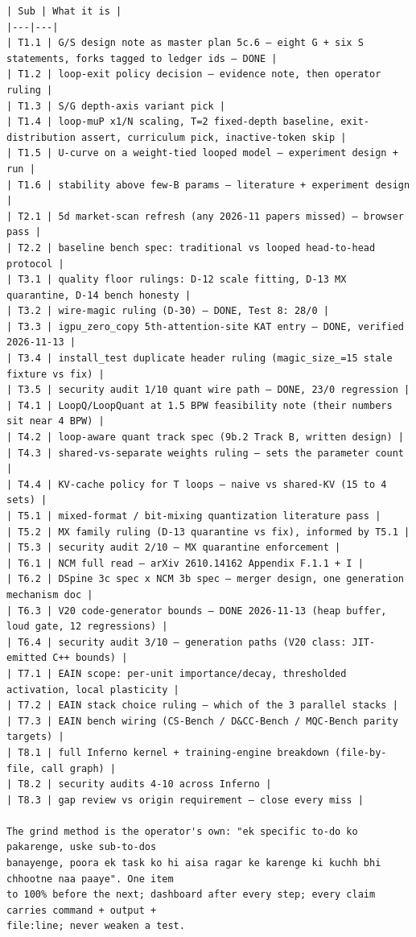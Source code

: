 \begin{Verbatim}[breaklines,breakanywhere,fontsize=\footnotesize]
| Sub | What it is |
|---|---|
| T1.1 | G/S design note as master plan 5c.6 — eight G + six S statements, forks tagged to ledger ids — DONE |
| T1.2 | loop-exit policy decision — evidence note, then operator ruling |
| T1.3 | S/G depth-axis variant pick |
| T1.4 | loop-muP x1/N scaling, T=2 fixed-depth baseline, exit-distribution assert, curriculum pick, inactive-token skip |
| T1.5 | U-curve on a weight-tied looped model — experiment design + run |
| T1.6 | stability above few-B params — literature + experiment design |
| T2.1 | 5d market-scan refresh (any 2026-11 papers missed) — browser pass |
| T2.2 | baseline bench spec: traditional vs looped head-to-head protocol |
| T3.1 | quality floor rulings: D-12 scale fitting, D-13 MX quarantine, D-14 bench honesty |
| T3.2 | wire-magic ruling (D-30) — DONE, Test 8: 28/0 |
| T3.3 | igpu_zero_copy 5th-attention-site KAT entry — DONE, verified 2026-11-13 |
| T3.4 | install_test duplicate header ruling (magic_size_=15 stale fixture vs fix) |
| T3.5 | security audit 1/10 quant wire path — DONE, 23/0 regression |
| T4.1 | LoopQ/LoopQuant at 1.5 BPW feasibility note (their numbers sit near 4 BPW) |
| T4.2 | loop-aware quant track spec (9b.2 Track B, written design) |
| T4.3 | shared-vs-separate weights ruling — sets the parameter count |
| T4.4 | KV-cache policy for T loops — naive vs shared-KV (15 to 4 sets) |
| T5.1 | mixed-format / bit-mixing quantization literature pass |
| T5.2 | MX family ruling (D-13 quarantine vs fix), informed by T5.1 |
| T5.3 | security audit 2/10 — MX quarantine enforcement |
| T6.1 | NCM full read — arXiv 2610.14162 Appendix F.1.1 + I |
| T6.2 | DSpine 3c spec x NCM 3b spec — merger design, one generation mechanism doc |
| T6.3 | V20 code-generator bounds — DONE 2026-11-13 (heap buffer, loud gate, 12 regressions) |
| T6.4 | security audit 3/10 — generation paths (V20 class: JIT-emitted C++ bounds) |
| T7.1 | EAIN scope: per-unit importance/decay, thresholded activation, local plasticity |
| T7.2 | EAIN stack choice ruling — which of the 3 parallel stacks |
| T7.3 | EAIN bench wiring (CS-Bench / D&CC-Bench / MQC-Bench parity targets) |
| T8.1 | full Inferno kernel + training-engine breakdown (file-by-file, call graph) |
| T8.2 | security audits 4-10 across Inferno |
| T8.3 | gap review vs origin requirement — close every miss |

The grind method is the operator's own: "ek specific to-do ko pakarenge, uske sub-to-dos
banayenge, poora ek task ko hi aisa ragar ke karenge ki kuchh bhi chhootne naa paaye". One item
to 100% before the next; dashboard after every step; every claim carries command + output +
file:line; never weaken a test.


\end{Verbatim}

